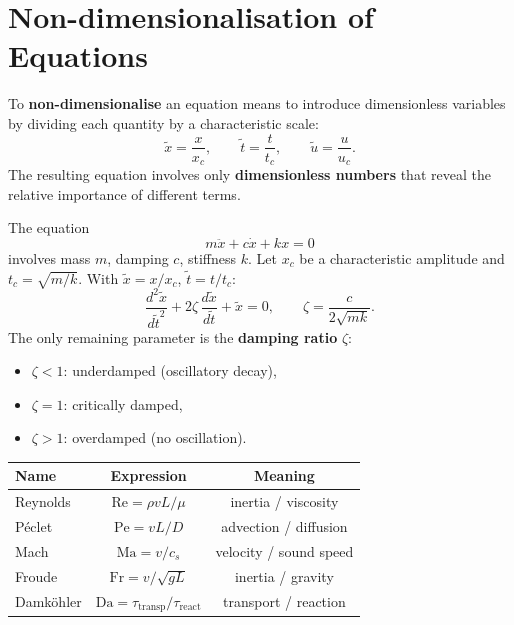 \section{Non-dimensionalisation of Equations}
\label{sec:nondim}

\begin{definition}
To \textbf{non-dimensionalise} an equation means to introduce
dimensionless variables by dividing each quantity by a characteristic
scale:
\[
  \tilde{x} = \frac{x}{x_c}, \qquad
  \tilde{t} = \frac{t}{t_c}, \qquad
  \tilde{u} = \frac{u}{u_c}.
\]
The resulting equation involves only \textbf{dimensionless numbers}
that reveal the relative importance of different terms.
\end{definition}

\begin{example}
The equation
\[
  m\ddot{x} + c\dot{x} + kx = 0
\]
involves mass $m$, damping $c$, stiffness $k$.  Let $x_c$ be a
characteristic amplitude and $t_c=\sqrt{m/k}$.  With $\tilde{x}=x/x_c$,
$\tilde{t}=t/t_c$:
\[
  \frac{d^2\tilde{x}}{d\tilde{t}^2}
  + 2\zeta\,\frac{d\tilde{x}}{d\tilde{t}}
  + \tilde{x} = 0,
  \qquad \zeta = \frac{c}{2\sqrt{mk}}.
\]
The only remaining parameter is the \textbf{damping ratio} $\zeta$:
\begin{itemize}
  \item $\zeta < 1$: underdamped (oscillatory decay),
  \item $\zeta = 1$: critically damped,
  \item $\zeta > 1$: overdamped (no oscillation).
\end{itemize}
\end{example}

\begin{keyformulas}[title=\textbf{Classic Dimensionless Numbers}]
\begin{center}
\begin{tabular}{lcc}
\toprule
Name & Expression & Meaning \\
\midrule
Reynolds & $\mathrm{Re}=\rho v L/\mu$ & inertia / viscosity \\
P\'eclet & $\mathrm{Pe}=vL/D$ & advection / diffusion \\
Mach & $\mathrm{Ma}=v/c_s$ & velocity / sound speed \\
Froude & $\mathrm{Fr}=v/\sqrt{gL}$ & inertia / gravity \\
Damk\"ohler & $\mathrm{Da}=\tau_{\text{transp}}/\tau_{\text{react}}$ & transport / reaction \\
\bottomrule
\end{tabular}
\end{center}
\end{keyformulas}

